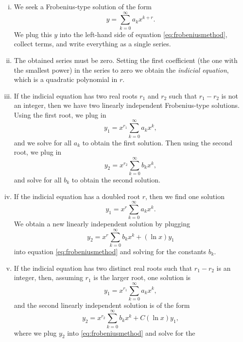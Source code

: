 \begin{enumerate}[(i)]
\item
We seek a Frobenius-type solution of the form
\begin{equation*}
y = \sum_{k=0}^\infty a_k x^{k+r} .
\end{equation*}
We plug this $y$ into the left-hand side of
equation \eqref{eq:frobeniusmethod}, collect
terms, and write everything as a single series.
\item
The obtained series must be zero.  Setting the first
coefficient (the one with the smallest power) in the series
to zero we obtain the
\emph{indicial equation}, which is a quadratic polynomial in $r$.
\item
If the indicial equation has two real roots $r_1$ and $r_2$
such that $r_1 - r_2$ is not an integer, then we have two linearly
independent Frobenius-type solutions.  Using the first root, we plug in
\begin{equation*}
y_1 = x^{r_1} \sum_{k=0}^\infty a_k x^{k} ,
\end{equation*}
and we solve for all $a_k$ to obtain the first solution.  Then
using the second root,
we plug in
\begin{equation*}
y_2 = x^{r_2} \sum_{k=0}^\infty b_k x^{k} ,
\end{equation*}
and solve for all $b_k$ to obtain the second solution.
\item
If the indicial equation has a doubled root $r$, then we find 
one solution
\begin{equation*}
y_1 = x^{r} \sum_{k=0}^\infty a_k x^{k} .
\end{equation*}
We obtain a new linearly independent solution by plugging
\begin{equation*}
y_2 = x^{r} \sum_{k=0}^\infty b_k x^{k} + (\ln x) y_1
\end{equation*}
into equation \eqref{eq:frobeniusmethod} and solving for the constants $b_k$.
\item \label{frobenius:casev}
If the indicial equation has two distinct real roots such that $r_1-r_2$ is
an integer, then, assuming $r_1$ is the larger root, one solution is
\begin{equation*}
y_1 = x^{r_1} \sum_{k=0}^\infty a_k x^{k} ,
\end{equation*}
and the second linearly independent solution is of the form
\begin{equation*}
y_2 = x^{r_2} \sum_{k=0}^\infty b_k x^{k} + C (\ln x) y_1 ,
\end{equation*}
where we plug $y_2$ into \eqref{eq:frobeniusmethod} and solve for the

\end{enumerate}
